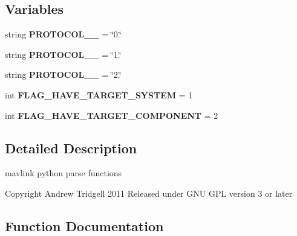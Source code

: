 \subsection*{Variables}
\begin{DoxyCompactItemize}
\item 
\mbox{\label{namespacepymavlink_1_1generator_1_1mavparse_a2f1946ee948a684dcbdd0bf5afee5689}} 
string {\bfseries P\+R\+O\+T\+O\+C\+O\+L\+\_\+\_} = \char`\"{}0.\char`\"{}
\item 
\mbox{\label{namespacepymavlink_1_1generator_1_1mavparse_ab308d4fdc1b0fbcfa2789aa6af08f46e}} 
string {\bfseries P\+R\+O\+T\+O\+C\+O\+L\+\_\+\_} = \char`\"{}1.\char`\"{}
\item 
\mbox{\label{namespacepymavlink_1_1generator_1_1mavparse_a87817b2175b76fab09524650d04cd139}} 
string {\bfseries P\+R\+O\+T\+O\+C\+O\+L\+\_\+\_} = \char`\"{}2.\char`\"{}
\item 
\mbox{\label{namespacepymavlink_1_1generator_1_1mavparse_aa767ba97b2d56ec79d71110d223fa05a}} 
int {\bfseries F\+L\+A\+G\+\_\+\+H\+A\+V\+E\+\_\+\+T\+A\+R\+G\+E\+T\+\_\+\+S\+Y\+S\+T\+EM} = 1
\item 
\mbox{\label{namespacepymavlink_1_1generator_1_1mavparse_ac489014afb91b659714bb125f9b22c8b}} 
int {\bfseries F\+L\+A\+G\+\_\+\+H\+A\+V\+E\+\_\+\+T\+A\+R\+G\+E\+T\+\_\+\+C\+O\+M\+P\+O\+N\+E\+NT} = 2
\end{DoxyCompactItemize}


\subsection{Detailed Description}
\begin{DoxyVerb}mavlink python parse functions

Copyright Andrew Tridgell 2011
Released under GNU GPL version 3 or later
\end{DoxyVerb}
 

\subsection{Function Documentation}
\mbox{\label{namespacepymavlink_1_1generator_1_1mavparse_aade73d992c7a3adb54e6ed2682ba97ce}} 
